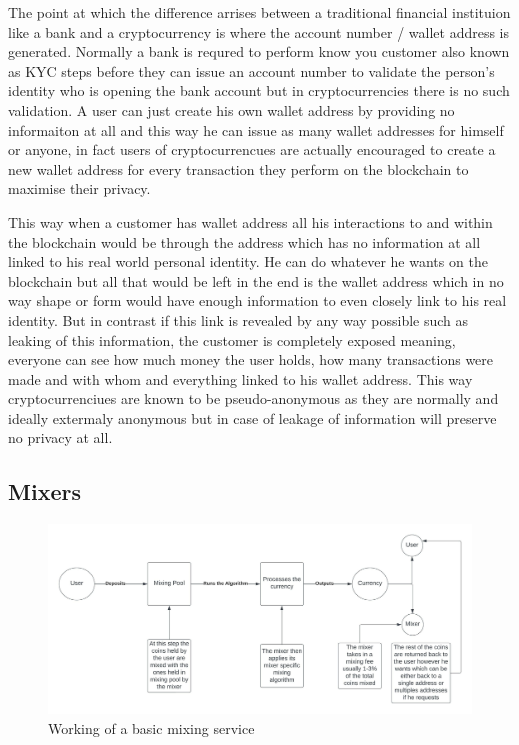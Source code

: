 \documentclass{article}
\begin{document}
        The point at which the difference arrises between a traditional financial instituion like a bank and a cryptocurrency is where the account number / wallet address is generated. Normally a bank is requred to perform know you customer also known as KYC steps before they can issue an account number to validate the person's identity who is opening the bank account but in cryptocurrencies there is no such validation. A user can just create his own wallet address by providing no informaiton at all and this way he can issue as many wallet addresses for himself or anyone, in fact users of cryptocurrencues are actually encouraged to create a new wallet address for every transaction they perform on the blockchain to maximise their privacy. 
        
        This way when a customer has wallet address all his interactions to and within the blockchain would be through the address which has no information at all linked to his real world personal identity. He can do whatever he wants on the blockchain but all that would be left in the end is the wallet address which in no way shape or form would have enough information to even closely link to his real identity. But in contrast if this link is revealed by any way possible such as leaking of this information, the customer is completely exposed meaning, everyone can see how much money the user holds, how many transactions were made and with whom and everything linked to his wallet address. This way cryptocurrenciues are known to be pseudo-anonymous as they are normally and ideally extermaly anonymous but in case of leakage of information will preserve no privacy at all.

\pagebreak

    \subsection{Mixers}
        
        \begin{figure}[!htb]
            \centering
            \includegraphics[width=150mm,scale=0.7]{Mixers.jpeg}
            \caption{Working of a basic mixing service}
            \label{Figure 3}
        \end{figure}
        
\end{document}
